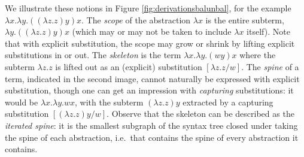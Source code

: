 \documentclass[runningheads]{llncs}
\begin{document}
We illustrate these notions in Figure \ref{fig:derivationsbalunbal}, for the example $\lambda x.\lambda y.((\lambda z.z)y)x$. The \emph{scope} of the abstraction $\lambda x$ is the entire subterm, $\lambda y.((\lambda z.z)y)x$ (which may or may not be taken to include $\lambda x$ itself). Note that with explicit substitution, the scope may grow or shrink by lifting explicit substitutions in or out. The \emph{skeleton} is the term $\lambda x.\lambda y.(wy)x$ where the subterm $\lambda z.z$ is lifted out as an (explicit) substitution $[\lambda z.z/w]$. The \emph{spine} of a term, indicated in the second image, cannot naturally be expressed with explicit substitution, though one can get an impression with \emph{capturing} substitutions: it would be $\lambda x.\lambda y.wx$, with the subterm $(\lambda z.z)y$ extracted by a capturing substitution $[(\lambda z.z)y/w]$. Observe that the skeleton can be described as the \emph{iterated spine}: it is the smallest subgraph of the syntax tree closed under taking the spine of each abstraction, i.e.\ that contains the spine of every abstraction it contains.
\end{document}
